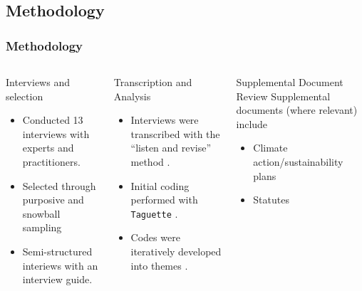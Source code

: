 \subsection{Methodology}

\begin{frame}
    \frametitle{Methodology}


    \begin{columns}
        \column[t]{3.33cm}
        \begin{block}{Interviews and selection}
            \begin{itemize}[<+->]
                \item Conducted 13 interviews with experts and practitioners.
                \item Selected through purposive and snowball sampling
                \item Semi-structured interiews with an interview guide.
            \end{itemize}
        \end{block}
        \column[t]{3.33cm}
        \begin{block}{Transcription and Analysis}
            \begin{itemize}[<+->]
                \item Interviews were transcribed with the ``listen and revise''
                method \cite{battaglia_listen_2024}.
                \item Initial coding performed with \texttt{Taguette}
                \cite{rampin_taguette_2021}.
                \item Codes were iteratively developed into themes
                \cite{braun_using_2006}.
            \end{itemize}
        \end{block}
        \column[t]{3.33cm}
        \begin{block}{Supplemental Document Review}
            Supplemental documents (where relevant) include
            \begin{itemize}[<+->]
                \item Climate action/sustainability plans
                \item Statutes
            \end{itemize}
        \end{block}
    \end{columns}
\end{frame}

